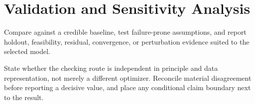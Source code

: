 \section{Validation and Sensitivity Analysis}

Compare against a credible baseline, test failure-prone assumptions, and report
holdout, feasibility, residual, convergence, or perturbation evidence suited to
the selected model.

State whether the checking route is independent in principle and data
representation, not merely a different optimizer. Reconcile material
disagreement before reporting a decisive value, and place any conditional
claim boundary next to the result.
